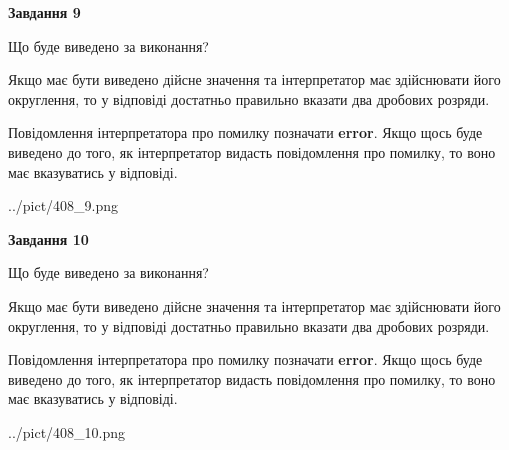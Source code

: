 \documentclass[12pt, ukrainian]{article}
\begin{document}
{\begin {Large}
{\begin {center}\textbf{Завдання 9}\end {center}}\par
Що буде виведено за виконання? \par

Якщо має бути виведено дійсне значення та інтерпретатор має здійснювати його округлення, 
то у відповіді достатньо правильно вказати два дробових розряди.

Повідомлення інтерпретатора про помилку позначати \textbf{error}.
Якщо щось буде виведено до того, як інтерпретатор видасть повідомлення про помилку, 
то воно має вказуватись у відповіді. \par

\begin{center}
	{../pict/408_9.png}
\end{center}
\newpage

{\begin {center}\textbf{Завдання 10}\end {center}}\par
Що буде виведено за виконання? \par

Якщо має бути виведено дійсне значення та інтерпретатор має здійснювати його округлення, 
то у відповіді достатньо правильно вказати два дробових розряди.

Повідомлення інтерпретатора про помилку позначати \textbf{error}.
Якщо щось буде виведено до того, як інтерпретатор видасть повідомлення про помилку, 
то воно має вказуватись у відповіді. \par

\begin{center}
	{../pict/408_10.png}
\end{center}
\newpage

\end {Large}}
\end{document}
